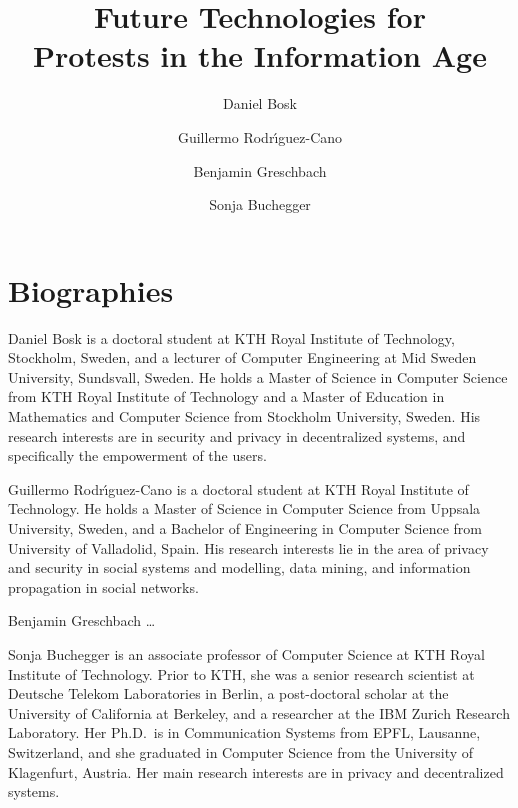 \documentclass{article}
\title{%
  Future Technologies for\\
  Protests in the Information Age
}
\author{Daniel Bosk}
\author{Guillermo Rodr\'{\i}guez-Cano}
\author{Benjamin Greschbach}
\author{Sonja Buchegger}
\affil{%
  School of Computer Science and Communication,\\
  KTH Royal Institute of Technology,
  Stockholm\\
  \email{\{dbosk,gurc,bgre,buc\}@kth.se}
}
\theoremstyle{definition}
\begin{document}
\maketitle

\begin{abstract}
  
\end{abstract}

\clearpage
\tableofcontents
\clearpage


\acresetall{}






\printbibliography{}


\appendix
\section{Biographies}
\label{Biography}

Daniel Bosk is a doctoral student at KTH Royal Institute of Technology, 
Stockholm, Sweden, and a lecturer of Computer Engineering at Mid Sweden 
University, Sundsvall, Sweden.
He holds a Master of Science in Computer Science from KTH Royal Institute of 
Technology and a Master of Education in Mathematics and Computer Science from 
Stockholm University, Sweden.
His research interests are in security and privacy in decentralized systems, 
and specifically the empowerment of the users.

Guillermo Rodr\'{\i}guez-Cano is a doctoral student at KTH Royal Institute of 
Technology.
He holds a Master of Science in Computer Science from Uppsala University, 
Sweden, and a Bachelor of Engineering in Computer Science from University of 
Valladolid, Spain.
His research interests lie in the area of privacy and security in social 
systems and modelling, data mining, and information propagation in social 
networks.

Benjamin Greschbach \dots

Sonja Buchegger is an associate professor of Computer Science at KTH Royal 
Institute of Technology.
Prior to KTH, she was a
senior research scientist at Deutsche Telekom Laboratories in Berlin,
a post-doctoral scholar at the University of California at Berkeley,
and a researcher at the IBM Zurich Research Laboratory.
Her Ph.D.\ is in Communication Systems from EPFL, Lausanne, Switzerland, and 
she graduated in Computer Science from the University of Klagenfurt, Austria.
Her main research interests are in privacy and decentralized systems.
\end{document}
